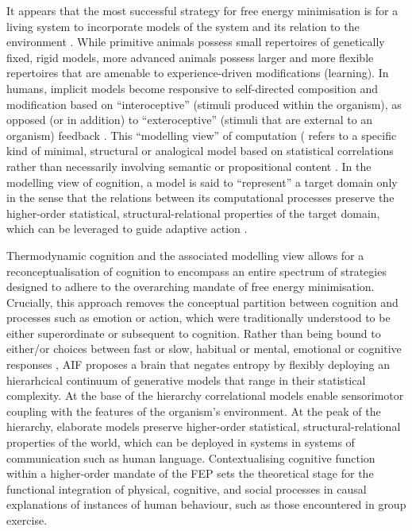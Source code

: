 \begin{CJK}{UTF8}{gbsn}
It appears that the most successful strategy for free energy minimisation is for a living system to incorporate models of the system and its relation to the environment \citep{Conant1970}.  While primitive animals possess small repertoires of genetically fixed, rigid models, more advanced animals possess larger and more flexible repertoires that are amenable to experience-driven modifications (learning).  In humans, implicit models become responsive to self-directed composition and modification based on ``interoceptive'' (stimuli produced within the organism), as opposed (or in addition) to ``exteroceptive'' (stimuli that are external to an organism) feedback \citep{Yufik1998,FeldmanBarrett2015}.  This ``modelling view'' of computation (\citep{Grush 2001;Chirimuuta2014} refers to a specific kind of minimal, structural or analogical model based on statistical correlations rather than necessarily involving semantic or propositional content \citep[also known as ``generative models''][]{Friston2001,OBrien2004,Huto2015}.  In the modelling view of cognition, a model is said to ``represent'' a target domain only in the sense that the relations between its computational processes preserve the higher-order statistical, structural-relational properties of the target domain, which can be leveraged to guide adaptive action \citep[see][8]{Ramstead2016}.

Thermodynamic cognition and the associated modelling view allows for a reconceptualisation of cognition to encompass an entire spectrum of strategies designed to adhere to the overarching mandate of free energy minimisation. Crucially, this approach removes the conceptual partition between cognition and processes such as emotion or action, which were traditionally understood to be either superordinate or subsequent to cognition.  Rather than being bound to either/or choices between fast or slow, habitual or mental, emotional or cognitive responses \citep[cf.][]{Kahneman2011}, AIF proposes a brain that negates entropy by flexibly deploying an hierarhcical continuum of generative models that range in their statistical complexity. At the base of the hierarchy correlational models enable sensorimotor coupling with the features of the organism's environment.  At the peak of the hierarchy, elaborate models preserve higher-order statistical, structural-relational properties of the world, which can be deployed in systems in systems of communication such as human language. Contextualising cognitive function within a higher-order mandate of the FEP sets the theoretical stage for the functional integration of physical, cognitive, and social processes in causal explanations of instances of human behaviour, such as those encountered in group exercise.


\end{CJK}
